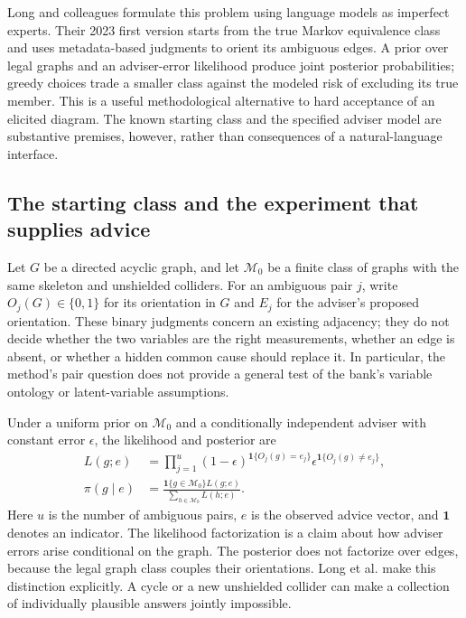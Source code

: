 Long and colleagues formulate this problem using language models as imperfect
experts. Their 2023 first version starts from the true Markov equivalence class
and uses metadata-based judgments to orient its ambiguous edges. A prior over
legal graphs and an adviser-error likelihood produce joint posterior
probabilities; greedy choices trade a smaller class against the modeled risk
of excluding its true member. This is a useful methodological alternative to
hard acceptance of an elicited diagram. The known starting class and the
specified adviser model are substantive premises, however, rather than
consequences of a natural-language interface.~\citep{exec17_imperfect_experts}

\subsection{The starting class and the experiment that supplies advice}

Let $G$ be a directed acyclic graph, and let $\mathcal M_0$ be a finite class of
graphs with the same skeleton and unshielded colliders. For an ambiguous pair
$j$, write $O_j(G)\in\{0,1\}$ for its orientation in $G$ and $E_j$ for the
adviser's proposed orientation. These binary judgments concern an existing
adjacency; they do not decide whether the two variables are the right
measurements, whether an edge is absent, or whether a hidden common cause
should replace it. In particular, the method's pair question does not provide
a general test of the bank's variable ontology or latent-variable assumptions.

Under a uniform prior on $\mathcal M_0$ and a conditionally independent adviser
with constant error $\epsilon$, the likelihood and posterior are
\begin{equation}
\begin{split}
 L(g;e)&=\prod_{j=1}^{u}(1-\epsilon)^{\mathbf 1\{O_j(g)=e_j\}}
                   \epsilon^{\mathbf 1\{O_j(g)\ne e_j\}},\\
 \pi(g\mid e)&=\frac{\mathbf 1\{g\in\mathcal M_0\}L(g;e)}
                        {\sum_{h\in\mathcal M_0}L(h;e)}.
\end{split}
\label{exec17:advice-posterior}
\end{equation}
Here $u$ is the number of ambiguous pairs, $e$ is the observed advice vector,
and $\mathbf 1$ denotes an indicator. The likelihood factorization is a claim
about how adviser errors arise conditional on the graph. The posterior does
not factorize over edges, because the legal graph class couples their
orientations. Long et al. make this distinction explicitly. A cycle or a new
unshielded collider can make a collection of individually plausible answers
jointly impossible.~\citep{exec17_imperfect_experts}

